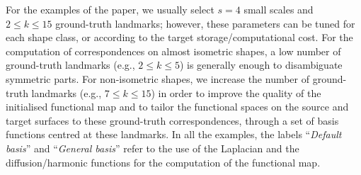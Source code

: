 \documentclass[acmtog,authorversion]{acmart}
\begin{document}
For the examples of the paper, we usually select \mbox{$s=4$} small scales and \mbox{$2\leq k\leq 15$} ground-truth landmarks; however, these parameters can be tuned for each shape class, or according to the target storage/computational cost. For the computation of correspondences on almost isometric shapes, a low number of ground-truth landmarks (e.g., \mbox{$2\leq k\leq 5$}) is generally enough to disambiguate symmetric parts. For non-isometric shapes, we increase the number of ground-truth landmarks (e.g., \mbox{$7\leq k\leq 15$}) in order to improve the quality of the initialised functional map and to tailor the functional spaces on the source and target surfaces to these ground-truth correspondences, through a set of basis functions centred at these landmarks. In all the examples, the labels ``\emph{Default basis}'' and ``\emph{General basis}'' refer to the use of the Laplacian and the diffusion/harmonic functions for the computation of the functional map.
%
\end{document}
